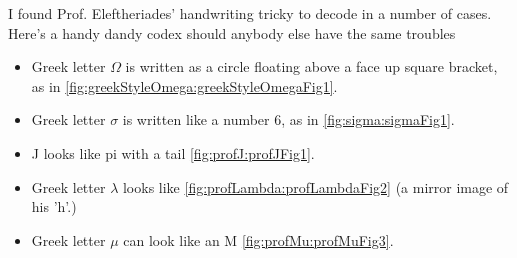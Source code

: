 
I found Prof. Eleftheriades' handwriting tricky to decode in a number of cases.  Here's a handy dandy codex should anybody else have the same troubles

\begin{itemize}
\item 
Greek letter \(\Omega\) is written as a circle floating above a face up square bracket, as in \cref{fig:greekStyleOmega:greekStyleOmegaFig1}.
\item Greek letter \( \sigma \) is written like a number 6, as in \cref{fig:sigma:sigmaFig1}.  
\item J looks like pi with a tail \cref{fig:profJ:profJFig1}.
\item Greek letter \( \lambda\) looks like \cref{fig:profLambda:profLambdaFig2} (a mirror image of his 'h'.)
\item Greek letter \( \mu\) can look like an M \cref{fig:profMu:profMuFig3}.
\end{itemize}

